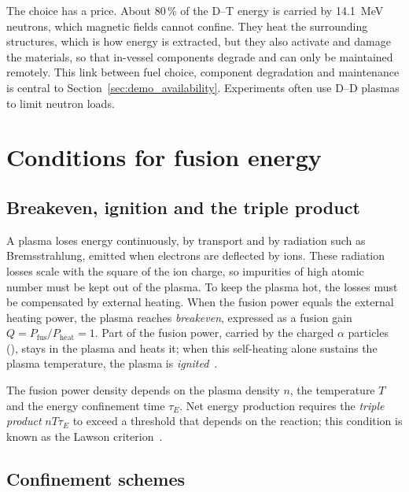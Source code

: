 \documentclass{book}
\begin{document}
The choice has a price. About 80\,\% of the D--T energy is carried by
\SI{14.1}{MeV} neutrons, which magnetic fields cannot confine. They heat the
surrounding structures, which is how energy is extracted, but they also
activate and damage the materials, so that in-vessel components degrade and
can only be maintained remotely. This link between fuel choice, component
degradation and maintenance is central to Section~\ref{sec:demo_availability}.
Experiments often use D--D plasmas to limit neutron loads.

\section{Conditions for fusion energy}
\label{sec:Eng_fusion}

\subsection{Breakeven, ignition and the triple product}

A plasma loses energy continuously, by transport and by radiation such as
Bremsstrahlung, emitted when electrons are deflected by ions. These radiation
losses scale with the square of the ion charge, so impurities of high atomic
number must be kept out of the plasma. To keep the plasma hot, the losses must
be compensated by external heating. When the fusion power equals the external
heating power, the plasma reaches \emph{breakeven}, expressed as a fusion gain
$Q = P_{\mathrm{fus}}/P_{\mathrm{heat}} = 1$. Part of the fusion power, carried
by the charged $\alpha$ particles (), stays in the plasma and heats it;
when this self-heating alone sustains the plasma temperature, the plasma is
\emph{ignited}~\cite{freidberg2007plasma,stacey2018fusion}.

The fusion power density depends on the plasma density $n$, the temperature
$T$ and the energy confinement time $\tau_E$. Net energy production requires
the \emph{triple product} $nT\tau_E$ to exceed a threshold that depends on the
reaction; this condition is known as the Lawson criterion~\cite{freidberg2007plasma}.

\subsection{Confinement schemes}
\end{document}

